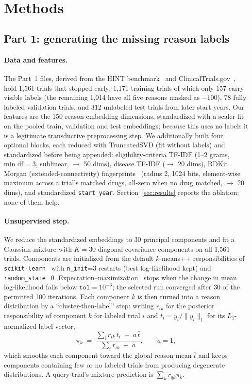 \section{Methods}
\label{sec:methods}

\subsection{Part 1: generating the missing reason labels}

\paragraph{Data and features.}
The Part~1 files, derived from the HINT benchmark~\cite{fu2022hint} and
ClinicalTrials.gov~\cite{clinicaltrials}, hold 1,561 trials that stopped early: 1,171 training trials of
which only 157 carry visible labels (the remaining 1,014 have all five reasons
masked as $-100$), 78 fully labeled validation trials, and 312 unlabeled test
trials from later start years. Our features are the 150 reason-embedding
dimensions, standardized with a scaler fit on the pooled train, validation and
test embeddings; because this uses no labels it is a legitimate transductive
preprocessing step. We additionally built four optional blocks, each reduced with
TruncatedSVD (fit without labels) and standardized before being appended:
eligibility-criteria TF-IDF (1--2 grams, $\mathrm{min\_df}=3$, sublinear, $\to$ 50
dims), disease TF-IDF ($\to$ 20 dims), RDKit~\cite{rdkit} Morgan (extended-connectivity)
fingerprints~\cite{rogers2010extended} (radius 2, 1024 bits, element-wise maximum across a trial's matched drugs, all-zero when no drug
matched, $\to$ 20 dims), and standardized \texttt{start\_year}. Section~\ref{sec:results}
reports the ablation; none of them help.

\paragraph{Unsupervised step.}
We reduce the standardized embeddings to 30 principal components and fit a
Gaussian mixture with $K=30$ diagonal-covariance components on all 1,561 trials.
Components are initialized from the default $k$-means++ responsibilities of
\texttt{scikit-learn}~\cite{pedregosa2011scikit}
with \texttt{n\_init}=3 restarts (best log-likelihood kept) and
\texttt{random\_state}=0. Expectation--maximization~\cite{dempster1977em} stops when the change in mean
log-likelihood falls
below $\texttt{tol}=10^{-3}$; the selected run converged after 30 of the permitted
100 iterations. Each component $k$ is then turned into a reason distribution by a
``cluster-then-label'' step: writing $r_{ik}$ for the posterior responsibility of
component $k$ for labeled trial $i$ and $t_i = y_i / \lVert y_i \rVert_1$ for its
$L_1$-normalized label vector,
\begin{equation}
\pi_k \;=\; \frac{\sum_i r_{ik}\, t_i \;+\; a\,\bar{t}}{\sum_i r_{ik} \;+\; a},
\qquad a = 1,
\end{equation}
which smooths each component toward the global reason mean $\bar{t}$ and keeps
components containing few or no labeled trials from producing degenerate
distributions. A query trial's mixture prediction is $\sum_k r_{qk}\pi_k$.

